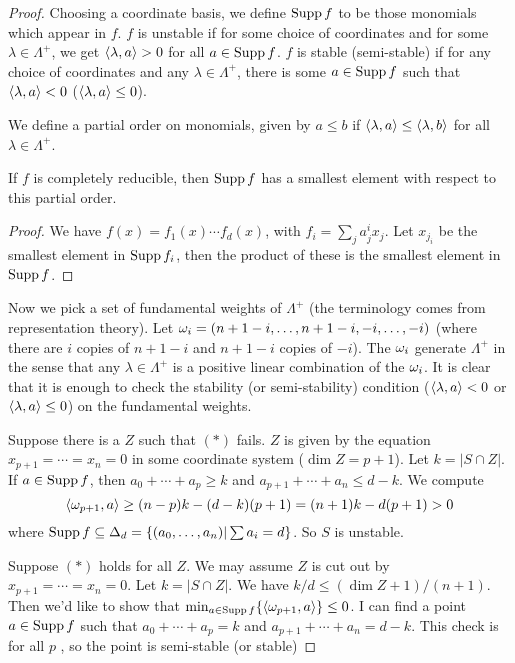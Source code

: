 \begin{proof}
 Choosing a coordinate basis, we define $\operatorname{Supp} f$ to be those monomials which appear in $f$. $f$ is unstable if for some choice of coordinates and for some $\lambda\in \Lambda^+$, we get $\langle\lambda,a\rangle >0$ for all $a\in \operatorname{Supp} f$. $f$ is stable (semi-stable) if for any choice of coordinates and any $\lambda\in \Lambda^+$, there is some $a\in \operatorname{Supp} f$ such that $\langle\lambda, a\rangle < 0$ ($\langle\lambda,a\rangle \le 0$).
 
 We define a partial order on monomials, given by $a\le b$ if $\langle\lambda, a\rangle\le \langle\lambda,b\rangle$ for all $\lambda\in\Lambda^+$.
 \begin{claim}
  If $f$ is completely reducible, then $\operatorname{Supp} f$ has a smallest element with respect to this partial order.
 \end{claim}
 \begin{proof}
  We have $f(x)=f_1(x)\cdots f_d(x)$, with $f_i=\sum_j a^i_j x_j$. Let $x_{j_i}$ be the smallest element in $\operatorname{Supp} f_i$, then the product of these is the smallest element in $\operatorname{Supp} f$.
  \renewcommand{\qedsymbol}{$\Box_{\text{Claim}}$}
 \end{proof}
 Now we pick a set of fundamental weights of $\Lambda^+$ (the terminology comes from representation theory). Let $\omega_i=(n+1-i,\dots, n+1-i,-i,\dots, -i)$ (where there are $i$ copies of $n+1-i$ and $n+1-i$ copies of $-i$). The $\omega_i$ generate $\Lambda^+$ in the sense that any $\lambda\in\Lambda^+$ is a positive linear combination of the $\omega_i$. It is clear that it is enough to check the stability (or semi-stability) condition ($\langle\lambda,a\rangle<0$ or $\langle\lambda,a\rangle\le 0$) on the fundamental weights.
 
 Suppose there is a $Z$ such that $(*)$ fails. $Z$ is given by the equation $x_{p+1}=\cdots = x_n=0$ in some coordinate system ($\dim Z=p+1$). Let $k=|S\cap Z|$. If $a\in \operatorname{Supp} f$, then $a_0+\cdots +a_p \ge k$ and $a_{p+1}+\cdots + a_n \le d-k$. We compute
 \[
  \langle\omega_{p+1},a\rangle \ge (n-p)k - (d-k)(p+1) = (n+1)k-d(p+1)>0
 \]
 where $\operatorname{Supp} f \subseteq \Delta_d = \{(a_0,\dots, a_n)|\sum a_i=d\}$. So $S$ is unstable.
 
 Suppose $(*)$ holds for all $Z$. We may assume $Z$ is cut out by $x_{p+1}=\cdots =x_n=0$. Let $k=|S\cap Z|$. We have $k/d \le (\dim Z+1)/(n+1)$. Then we'd like to show that $\min_{a\in \operatorname{Supp} f}\{\langle\omega_{p+1},a\rangle\}\le 0$. I can find a point $a\in \operatorname{Supp} f$ such that $a_0+\cdots +a_p=k$ and $a_{p+1}+\cdots +a_n=d-k$. This check is for all $p$ \anton{}, so the point is semi-stable (or stable)
\end{proof}

